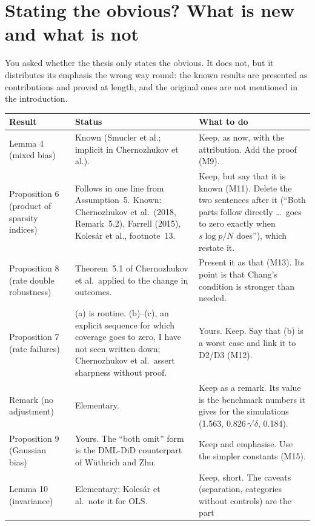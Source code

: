 \documentclass[11pt]{article}
\theoremstyle{plain}
\theoremstyle{remark}
\begin{document}
\section{Stating the obvious? What is new and what is not}\label{sec:obvious}

You asked whether the thesis only states the obvious. It does not, but it
distributes its emphasis the wrong way round: the known results are presented
as contributions and proved at length, and the original ones are not mentioned
in the introduction.

\begin{center}\small
\begin{tabular}{p{}p{}p{}}
\toprule
Result & Status & What to do\\
\midrule
Lemma 4 (mixed bias) & Known (Smucler et al.; implicit in Chernozhukov et al.). &
  Keep, as now, with the attribution. Add the proof (M9).\\
Proposition 6 (product of sparsity indices) & Follows in one line from
  Assumption~5. Known: Chernozhukov et al.\ (2018, Remark~5.2), Farrell (2015),
  Kolesár et al., footnote~13. & Keep, but say that it is known (M11). Delete
  the two sentences after it (``Both parts follow directly \dots\ goes to zero
  exactly when $s\log p/N$ does''), which restate it.\\
Proposition 8 (rate double robustness) & Theorem~5.1 of Chernozhukov et al.\
  applied to the change in outcomes. & Present it as that (M13). Its point is
  that Chang's condition is stronger than needed.\\
Proposition 7 (rate failures) & (a) is routine. (b)--(c), an explicit sequence
  for which coverage goes to zero, I have not seen written down; Chernozhukov et
  al.\ assert sharpness without proof. & Yours. Keep. Say that (b) is a worst
  case and link it to D2/D3 (M12).\\
Remark (no adjustment) & Elementary. & Keep as a remark. Its value is the
  benchmark numbers it gives for the simulations (1.563, $0.826\,\gamma'\delta$,
  0.184).\\
Proposition 9 (Gaussian bias) & Yours. The ``both omit'' form is the DML-DiD
  counterpart of Wüthrich and Zhu. & Keep and emphasise. Use the simpler
  constants (M15).\\
Lemma 10 (invariance) & Elementary; Kolesár et al.\ note it for OLS. & Keep,
  short. The caveats (separation, categories without controls) are the part

\end{tabular}
\end{center}
\end{document}
